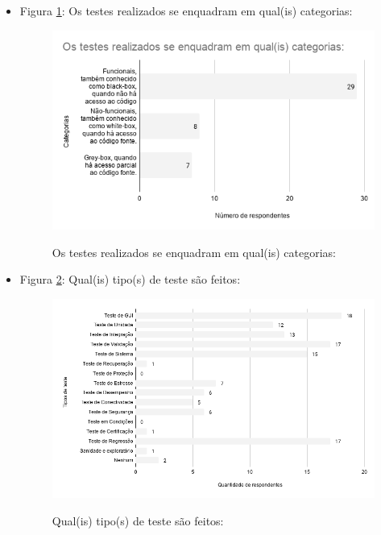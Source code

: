 \begin{itemize}
    
    \item Figura \ref{figure:s_categoriastestes}: Os testes realizados se enquadram em qual(is) categorias:
    \begin{figure}[!htb]
    \centering
    \includegraphics[width=.80\textwidth]{images/s_categoriastestes.png}
    \label{figure:s_categoriastestes}
    \caption{Os testes realizados se enquadram em qual(is) categorias:}
    \end{figure}       
    
  
     \item Figura \ref{figure:s_tipostestes}: Qual(is) tipo(s) de teste são feitos:
    \begin{figure}[!htb]
    \centering
    \includegraphics[width=.80\textwidth]{images/s_tipostestes.png}
    \label{figure:s_tipostestes}
    \caption{Qual(is) tipo(s) de teste são feitos:}
    \end{figure}
    

\end{itemize}
